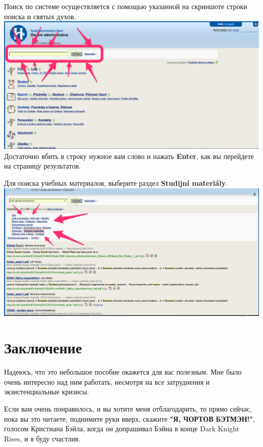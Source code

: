 \documentclass[a4paper,12pt]{article}
\begin{document}
Поиск по системе осуществляется с помощью указанной на скриншоте строки
поиска и святых духов. \\

\includegraphics[width=\textwidth]{s20} \\

Достаточно вбить в строку нужное вам слово и нажать \textbf{Enter}, 
как вы перейдете на страницу результатов.

Для поиска учебных материалов, выберите раздел \textbf{Studijní materiály}. \\

\includegraphics[width=\textwidth]{s21} \\



\newpage

\section{Заключение}

Надеюсь, что это небольшое пособие окажется для вас полезным. 
Мне было очень интересно над ним работать, несмотря на все затруднения 
и экзистенциальные кризисы.

Если вам очень понравилось, и вы хотите меня отблагодарить,
то прямо сейчас, пока вы это читаете, поднимите руки вверх, 
скажите \textbf{"Я, ЧОРТОВ БЭТМЭН!"}, голосом Кристиана Бэйла, 
когда он допрашивал Бэйна в конце Dark Knight Rises, и я буду счастлив. \\
\end{document}
